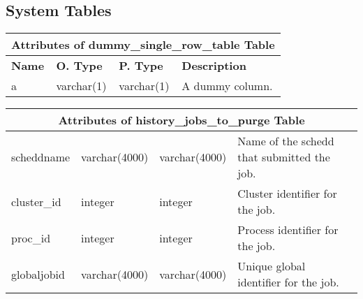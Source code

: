 \subsection{System Tables}
\begin{center}
  \begin{tabular}{|l|l|l|p{4in}|}\hline
    \multicolumn{4}{|c|}{\textbf{Attributes of dummy\_single\_row\_table Table}}\\ \hline
    \textbf{Name} & \textbf{O. Type} & \textbf{P. Type} & \textbf{Description}\\ \hline
    a & varchar(1) & varchar(1) & A dummy column. \\ \hline
  \end{tabular}
\vspace{24pt}

  \begin{tabular}{|l|l|l|p{3.2in}|}\hline
    \multicolumn{4}{|c|}{\textbf{Attributes of history\_jobs\_to\_purge Table}}\\ \hline
    scheddname & varchar(4000) & varchar(4000) & Name of the schedd that submitted the job. \\ \hline
    cluster\_id & integer & integer & Cluster identifier for the job. \\ \hline
    proc\_id & integer & integer & Process identifier for the job. \\ \hline
    globaljobid & varchar(4000) & varchar(4000) & Unique global identifier for the job. \\ \hline
  \end{tabular}
\vspace{24pt}


\end{center}
